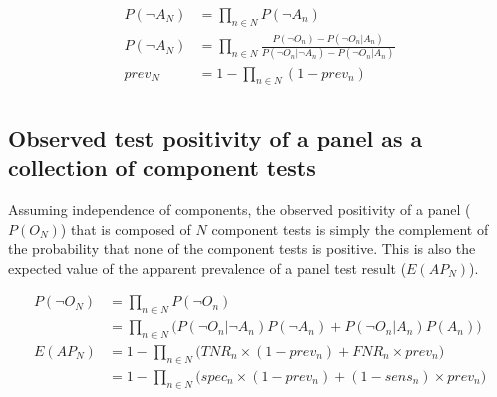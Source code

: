 \documentclass[a4paper, 12pt, twoside]{article}
\let\Oldsubsection\subsection
\renewcommand{\subsection}{\FloatBarrier\Oldsubsection}
\begin{document}
\begin{equation*}
\begin{aligned}
P(\neg A_N) &= \prod_{n \in N}{P(\neg A_n)} \\
P(\neg A_N) &= \prod_{n \in N}{\frac{P(\neg O_n) - P(\neg O_n|A_n)}{P(\neg O_n|\neg A_n) - P(\neg O_n|A_n)}} \\
prev_N &= 1- \prod_{n \in N}{ (1-prev_n) } \\
\end{aligned}
\end{equation*}
%
%

\subsection{Observed test positivity of a panel as a collection of component tests}

Assuming independence of components, the observed positivity of a panel (\(P(O_N)\)) that is composed of \(N\) component tests is simply the complement of the probability that none of the component tests is positive. This is also the expected value of the apparent prevalence of a panel test result (\(E(AP_N)\)).

\begin{equation*}
\begin{aligned}
P(\neg O_N) &= \prod_{n \in N}{P(\neg O_n)} \\
 &= \prod_{n \in N}{ \bigg(P(\neg O_n|\neg A_n)P(\neg A_n) + P(\neg O_n|A_n)P(A_n)} \bigg) \\
E(AP_N) &= 1- \prod_{n \in N}{ \bigg(TNR_n \times (1-prev_n) + FNR_n \times prev_n} \bigg) \\
 &= 1- \prod_{n \in N}{ \bigg(spec_n \times (1-prev_n) + (1-sens_n) \times prev_n} \bigg) \\
\end{aligned}
\end{equation*}
\end{document}
